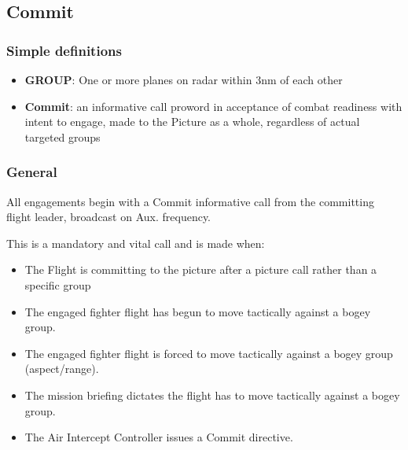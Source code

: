 \subsection{Commit}

\subsubsection*{Simple definitions}

\begin{itemize}

  \item \textbf{GROUP}: One or more planes on radar within 3nm of each other

  \item \textbf{Commit}: an informative call proword in acceptance of combat
    readiness with intent to engage, made to the Picture as a whole, regardless
    of actual targeted groups

\end{itemize}

\subsubsection*{General}

All engagements begin with a Commit informative call from the committing flight
leader, broadcast on Aux. frequency.

This is a mandatory and vital call and is made when:

\begin{itemize}

  \item The Flight is committing to the picture after a picture call rather
    than a specific group

  \item The engaged fighter flight has begun to move tactically against a bogey
    group.

  \item The engaged fighter flight is forced to move tactically against a bogey
    group (aspect/range).

  \item The mission briefing dictates the flight has to move tactically against
    a bogey group.

  \item The Air Intercept Controller issues a Commit directive.

\end{itemize}

